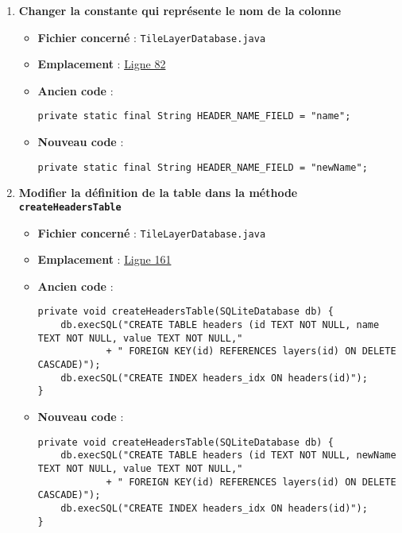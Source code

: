 \begin{enumerate}
    \item \textbf{Changer la constante qui représente le nom de la colonne}
          \begin{itemize}
              \item \textbf{Fichier concerné} : \texttt{TileLayerDatabase.java}
              \item \textbf{Emplacement} : \href{https://github.com/MarcusWolschon/osmeditor4android/blob/dcabe8084aa15f5551a37c990516bf73398af1bf/src/main/java/de/blau/android/resources/TileLayerDatabase.java#L82}{Ligne 82}
              \item \textbf{Ancien code} :
                    \begin{lstlisting}[style=Java, caption=Ancien code]
private static final String HEADER_NAME_FIELD = "name";
        \end{lstlisting}
              \item \textbf{Nouveau code} :
                    \begin{lstlisting}[style=Java, caption=Nouveau code]
private static final String HEADER_NAME_FIELD = "newName";
        \end{lstlisting}
          \end{itemize}

    \item \textbf{Modifier la définition de la table dans la méthode \texttt{createHeadersTable}}
          \begin{itemize}
              \item \textbf{Fichier concerné} : \texttt{TileLayerDatabase.java}
              \item \textbf{Emplacement} : \href{https://github.com/MarcusWolschon/osmeditor4android/blob/dcabe8084aa15f5551a37c990516bf73398af1bf/src/main/java/de/blau/android/resources/TileLayerDatabase.java#L161}{Ligne 161}
              \item \textbf{Ancien code} :
                    \begin{lstlisting}[style=Java, caption=Ancien code]
private void createHeadersTable(SQLiteDatabase db) {
    db.execSQL("CREATE TABLE headers (id TEXT NOT NULL, name TEXT NOT NULL, value TEXT NOT NULL,"
            + " FOREIGN KEY(id) REFERENCES layers(id) ON DELETE CASCADE)");
    db.execSQL("CREATE INDEX headers_idx ON headers(id)");
}
        \end{lstlisting}
              \item \textbf{Nouveau code} :
                    \begin{lstlisting}[style=Java, caption=Nouveau code]
private void createHeadersTable(SQLiteDatabase db) {
    db.execSQL("CREATE TABLE headers (id TEXT NOT NULL, newName TEXT NOT NULL, value TEXT NOT NULL,"
            + " FOREIGN KEY(id) REFERENCES layers(id) ON DELETE CASCADE)");
    db.execSQL("CREATE INDEX headers_idx ON headers(id)");
}
        \end{lstlisting}
          \end{itemize}


\end{enumerate}
